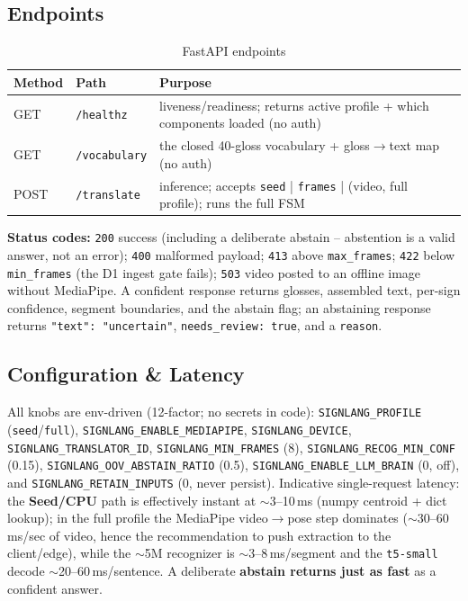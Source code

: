 \documentclass[12pt,a4paper]{article}
\begin{document}
\subsection{Endpoints}

\begin{table}[H]
\centering
\caption{FastAPI endpoints}
\small
\begin{tabularx}{\linewidth}{@{} l l L @{}}
\toprule
\textbf{Method} & \textbf{Path} & \textbf{Purpose} \\
\midrule
GET & \texttt{/healthz} & liveness/readiness; returns active profile + which components loaded (no auth) \\
GET & \texttt{/vocabulary} & the closed 40-gloss vocabulary + gloss$\rightarrow$text map (no auth) \\
POST & \texttt{/translate} & inference; accepts \texttt{seed} | \texttt{frames} | (video, full profile); runs the full FSM \\
\bottomrule
\end{tabularx}
\end{table}

\noindent\textbf{Status codes:} \texttt{200} success (including a deliberate abstain -- abstention is a valid answer, not an error); \texttt{400} malformed payload; \texttt{413} above \texttt{max\_frames}; \texttt{422} below \texttt{min\_frames} (the D1 ingest gate fails); \texttt{503} video posted to an offline image without MediaPipe. A confident response returns glosses, assembled text, per-sign confidence, segment boundaries, and the abstain flag; an abstaining response returns \texttt{"text": "uncertain"}, \texttt{needs\_review: true}, and a \texttt{reason}.

\subsection{Configuration \& Latency}

All knobs are env-driven (12-factor; no secrets in code): \texttt{SIGNLANG\_PROFILE} (\texttt{seed}/\texttt{full}), \texttt{SIGNLANG\_ENABLE\_MEDIAPIPE}, \texttt{SIGNLANG\_DEVICE}, \texttt{SIGNLANG\_TRANSLATOR\_ID}, \texttt{SIGNLANG\_MIN\_FRAMES} (8), \texttt{SIGNLANG\_RECOG\_MIN\_CONF} (0.15), \texttt{SIGNLANG\_OOV\_ABSTAIN\_RATIO} (0.5), \texttt{SIGNLANG\_ENABLE\_LLM\_BRAIN} (0, off), and \texttt{SIGNLANG\_RETAIN\_INPUTS} (0, never persist). Indicative single-request latency: the \textbf{Seed/CPU} path is effectively instant at $\sim$3--10\,ms (numpy centroid + dict lookup); in the full profile the MediaPipe video$\rightarrow$pose step dominates ($\sim$30--60\,ms/sec of video, hence the recommendation to push extraction to the client/edge), while the $\sim$5M recognizer is $\sim$3--8\,ms/segment and the \texttt{t5-small} decode $\sim$20--60\,ms/sentence. A deliberate \textbf{abstain returns just as fast} as a confident answer.
\end{document}
